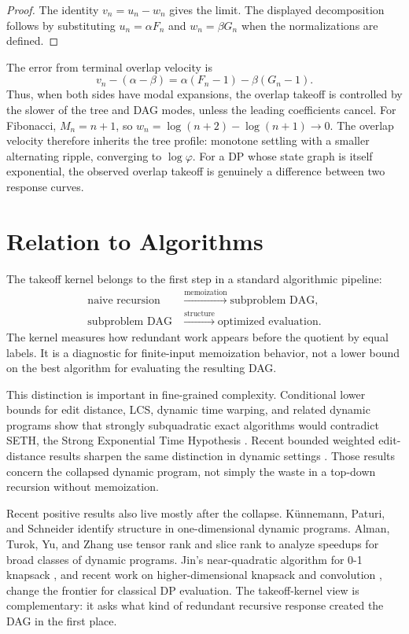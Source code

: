 \documentclass[10pt,twocolumn]{article}
\begin{document}
\begin{proof}
The identity \(v_n=u_n-w_n\) gives the limit.  The displayed decomposition follows by substituting \(u_n=\alpha F_n\) and \(w_n=\beta G_n\) when the normalizations are defined.
\end{proof}

The error from terminal overlap velocity is
\[
        v_n-(\alpha-\beta)
        =
        \alpha(F_n-1)-\beta(G_n-1).
\]
Thus, when both sides have modal expansions, the overlap takeoff is controlled by the slower of the tree and DAG modes, unless the leading coefficients cancel.  For Fibonacci, \(M_n=n+1\), so \(w_n=\log(n+2)-\log(n+1)\to0\).  The overlap velocity therefore inherits the tree profile: monotone settling with a smaller alternating ripple, converging to \(\log\varphi\).  For a DP whose state graph is itself exponential, the observed overlap takeoff is genuinely a difference between two response curves.

\section{Relation to Algorithms}

The takeoff kernel belongs to the first step in a standard algorithmic pipeline:
\[
\begin{aligned}
        \text{naive recursion}
        &\xrightarrow{\text{memoization}}
        \text{subproblem DAG},\\
        \text{subproblem DAG}
        &\xrightarrow{\text{structure}}
        \text{optimized evaluation}.
\end{aligned}
\]
The kernel measures how redundant work appears before the quotient by equal labels.  It is a diagnostic for finite-input memoization behavior, not a lower bound on the best algorithm for evaluating the resulting DAG.

This distinction is important in fine-grained complexity.  Conditional lower bounds for edit distance, LCS, dynamic time warping, and related dynamic programs show that strongly subquadratic exact algorithms would contradict SETH, the Strong Exponential Time Hypothesis \cite{impagliazzo2001,backurs2015,abboud2015,bringmann2015}.  Recent bounded weighted edit-distance results sharpen the same distinction in dynamic settings \cite{boneh2025}.  Those results concern the collapsed dynamic program, not simply the waste in a top-down recursion without memoization.

Recent positive results also live mostly after the collapse.  K\"unnemann, Paturi, and Schneider \cite{kunnemann2017} identify structure in one-dimensional dynamic programs.  Alman, Turok, Yu, and Zhang \cite{alman2024} use tensor rank and slice rank to analyze speedups for broad classes of dynamic programs.  Jin's near-quadratic algorithm for 0-1 knapsack \cite{jin2024}, and recent work on higher-dimensional knapsack and convolution \cite{grage2025}, change the frontier for classical DP evaluation.  The takeoff-kernel view is complementary: it asks what kind of redundant recursive response created the DAG in the first place.
\end{document}
